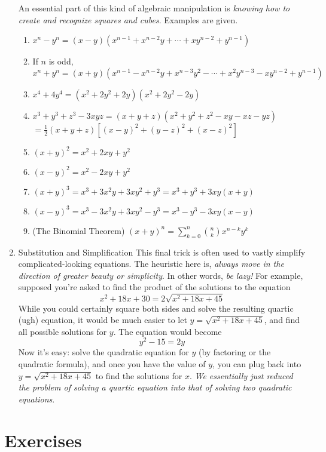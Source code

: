 \documentclass{article}
\begin{document}
\begin{enumerate}[label=\Roman*.]
    An essential part of this kind of algebraic manipulation is \emph{knowing how to create and recognize squares and cubes}. Examples are given.
    \begin{enumerate}[label=(\alph*)]
    \item $x^n - y^n = (x-y)(x^{n-1}+x^{n-2}y + \cdots + xy^{n-2}+y^{n-1})$ 
    \item If $n$ is odd, $x^n + y^n=(x+y)(x^{n-1}-x^{n-2}y+x^{n-3}y^2-\cdots + x^2y^{n-3}-xy^{n-2}+y^{n-1})$
    \item $x^{4} + 4y^{4} = (x^2 + 2y^2 + 2y)(x^2 + 2y^2-2y)$ 
    \item $x^3 + y^3 + z^3 - 3xyz = (x + y + z)(x^2 + y^2 + z^2 -xy - xz - yz)$\\$ = \frac{1}{2}(x+y+z)\left[ (x-y)^2 + (y-z)^2 + (x-z)^2\right]$ 
    \item $(x+y)^2 =x^2+2xy+y^2$
    \item $(x-y)^2 = x^2 -2xy+y^2$
    \item $(x+y)^3 = x^3 + 3x^2y +3xy^2 + y^3 = x^3 + y^3 +3xy(x+y)$
    \item $(x-y)^3 = x^3 - 3x^2y+3xy^2-y^3 = x^3 - y^3 -3xy(x-y)$
    \item (The Binomial Theorem) $(x+y)^n = \sum_{k=0}^n \binom{n}{k} x^{n-k}y^k$
\end{enumerate}
    \item Substitution and Simplification
    This final trick is often used to vastly simplify complicated-looking equations. The heuristic here is, \emph{always move in the direction of greater beauty or simplicity}. In other words, \emph{be lazy!} For example, supposed you're asked to find the product of the solutions to the equation \begin{equation}x^2+18x+30 = 2\sqrt{x^2 + 18x + 45}\end{equation} While you could certainly square both sides and solve the resulting quartic (ugh) equation, it would be much easier to let $y=\sqrt{x^2 + 18x + 45}$, and find all possible solutions for $y$. The equation would become
    \[y^2-15 = 2y\]
    Now it's easy: solve the quadratic equation for $y$ (by factoring or the quadratic formula), and once you have the value of $y$, you can plug back into $y=\sqrt{x^2 + 18x + 45}$ to find the solutions for $x$. \emph{We essentially just reduced the problem of solving a quartic equation into that of solving two quadratic equations}.
\end{enumerate}

\section{Exercises}
\end{document}
